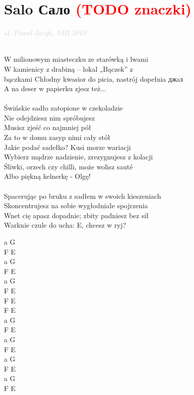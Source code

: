 \documentclass[a5paper, 10pt]{book}
\begin{document}
\section{Salo \foreignlanguage{russian}{Сало} \textcolor{red}{(TODO znaczki)}}\textcolor{lightgray}{\textit{sł. Paweł Jacyk, VIII 2019}}\\~\\
\begin{minipage}[t]{0.8\textwidth}
W milionowym miasteczku ze starówką i lwami	\\
W kamienicy z drabiną – lokal „Bączek” z \\bączkami		
Chłodny kwasior do picia, nastrój dopełnia \foreignlanguage{russian}{джaз}\\
A na deser w papierku zjesz też...\\
\\
\hspace*{5mm}Świńskie sadło zatopione w czekoladzie	\\
\hspace*{5mm}Nie odejdziesz nim spróbujesz			\\
\hspace*{5mm}Musisz zjeść co najmniej pół			\\
\hspace*{5mm}Za to w domu zasyp nimi cały stół		\\	

Jakie podać sadełko? Kusi morze wariacji\\
Wybierz mądrze nadzienie, zrezygnujesz z kolacji\\
Śliwki, orzech czy chilli, może wolisz sauté\\
Albo piękną kelnerkę - Olgę!\\
\\
Spacerując po bruku z sadłem w swoich kieszeniach\\
Skoncentrujesz na sobie wygłodniałe spojrzenia\\
Wnet cię apasz dopadnie; zbity padniesz bez sił\\
Warknie czule do ucha: E, chcesz w ryj?\\
\end{minipage}
\begin{minipage}[t]{0.2\textwidth}
a G\\
F E\\
a G\\
F E\\

a G\\
F E\\
F E\\
F E\\

a G\\
F E\\
a G\\
F E\\

a G\\
F E\\
a G\\
F E\\
\end{minipage}
\end{document}
